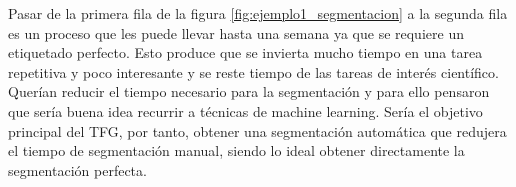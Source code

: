 Pasar de la primera fila de la figura \ref{fig:ejemplo1_segmentacion} a la segunda fila es un proceso que les puede llevar hasta una semana ya que se requiere un etiquetado perfecto. Esto produce que se invierta mucho tiempo en una tarea repetitiva y poco interesante y se reste tiempo de las tareas de interés científico. Querían reducir el tiempo necesario para la segmentación y para ello pensaron que sería buena idea recurrir a técnicas de machine learning. Sería el objetivo principal del TFG, por tanto, obtener una segmentación automática que redujera el tiempo de segmentación manual, siendo lo ideal obtener directamente la segmentación perfecta.